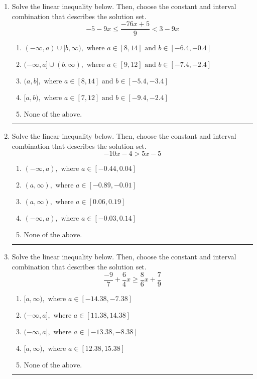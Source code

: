 \documentclass[14pt]{extbook}
\newcommand{\litem}[1]{\item#1\hspace*{-1cm}\rule{\textwidth}{0.4pt}}
\begin{document}
\begin{enumerate}
\litem{
Solve the linear inequality below. Then, choose the constant and interval combination that describes the solution set.\[ -5 - 9 x \leq \frac{-76 x + 5}{9} < 3 - 9 x \]\begin{enumerate}[label=\Alph*.]
\item \( (-\infty, a) \cup [b, \infty), \text{ where } a \in [8, 14] \text{ and } b \in [-6.4, -0.4] \)
\item \( (-\infty, a] \cup (b, \infty), \text{ where } a \in [9, 12] \text{ and } b \in [-7.4, -2.4] \)
\item \( (a, b], \text{ where } a \in [8, 14] \text{ and } b \in [-5.4, -3.4] \)
\item \( [a, b), \text{ where } a \in [7, 12] \text{ and } b \in [-9.4, -2.4] \)
\item \( \text{None of the above.} \)

\end{enumerate} }
\litem{
Solve the linear inequality below. Then, choose the constant and interval combination that describes the solution set.\[ -10x -4 > 5x -5 \]\begin{enumerate}[label=\Alph*.]
\item \( (-\infty, a), \text{ where } a \in [-0.44, 0.04] \)
\item \( (a, \infty), \text{ where } a \in [-0.89, -0.01] \)
\item \( (a, \infty), \text{ where } a \in [0.06, 0.19] \)
\item \( (-\infty, a), \text{ where } a \in [-0.03, 0.14] \)
\item \( \text{None of the above}. \)

\end{enumerate} }
\litem{
Solve the linear inequality below. Then, choose the constant and interval combination that describes the solution set.\[ \frac{-9}{7} + \frac{6}{4} x \geq \frac{8}{6} x + \frac{7}{9} \]\begin{enumerate}[label=\Alph*.]
\item \( [a, \infty), \text{ where } a \in [-14.38, -7.38] \)
\item \( (-\infty, a], \text{ where } a \in [11.38, 14.38] \)
\item \( (-\infty, a], \text{ where } a \in [-13.38, -8.38] \)
\item \( [a, \infty), \text{ where } a \in [12.38, 15.38] \)
\item \( \text{None of the above}. \)


\end{enumerate}}
\end{enumerate}
\end{document}
